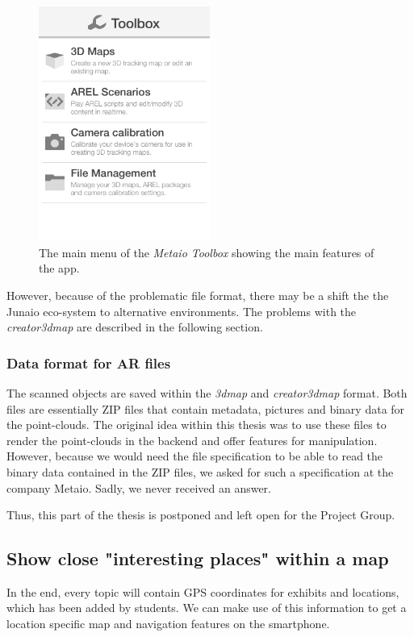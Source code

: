\begin{figure}[th]
	\centerline{\includegraphics[width=0.5\textwidth]{gfx/toolbox.png}}
	\caption{The main menu of the \emph{Metaio Toolbox} showing the main features of the app.}
	\label{MetToolbox}
\end{figure}	

However, because of the problematic file format, there may be a shift the the Junaio eco-system to alternative environments. The problems with the \emph{creator3dmap} are described in the following section.

\subsubsection{Data format for \ac{AR} files}
\label{creator3dmapProblem}
The scanned objects are saved within the \emph{3dmap} and \emph{creator3dmap} format. Both files are essentially ZIP files that contain metadata, pictures and binary data for the point-clouds. The original idea within this thesis was to use these files to render the point-clouds in the backend and offer features for manipulation. However, because we would need the file specification to be able to read the binary data contained in the ZIP files, we asked for such a specification at the company Metaio. Sadly, we never received an answer. 

Thus, this part of the thesis is postponed and left open for the Project Group.

\subsection{Show close "interesting places" within a map} 
In the end, every topic will contain \ac{GPS} coordinates for exhibits and locations, which has been added by students. We can make use of this information to get a location specific map and navigation features on the smartphone. 

